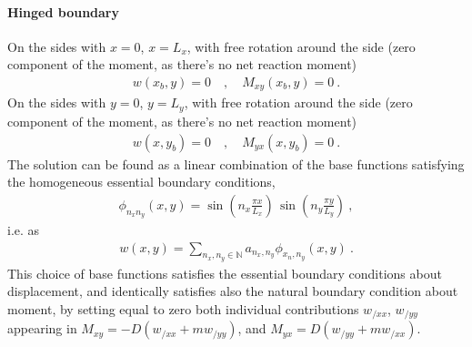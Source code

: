 \documentclass[letterpaper,10pt,english]{jupyterBook}
\begin{document}
\paragraph{Hinged boundary}
\label{\detokenize{ch/solids/plates-shells/kirchhoff:hinged-boundary}}
\sphinxAtStartPar
{} On the sides with \(x = 0\), \(x = L_x\), with free rotation around the side (zero component of the moment, as there’s no net reaction moment)
\begin{equation*}
\begin{split}w(x_b, y  ) = 0 \quad , \quad M_{xy}(x_b,y  ) = 0 \ .\end{split}
\end{equation*}
\sphinxAtStartPar
On the sides with \(y = 0\), \(y = L_y\), with free rotation around the side (zero component of the moment, as there’s no net reaction moment)
\begin{equation*}
\begin{split}w(x  , y_b) = 0 \quad , \quad M_{yx}(x  ,y_b) = 0 \ .\end{split}
\end{equation*}
\sphinxAtStartPar
{} The solution can be found as a linear combination of the base functions satisfying the homogeneous essential boundary conditions,
\begin{equation*}
\begin{split}\phi_{n_x n_y}(x,y) = \sin\left( n_x \frac{\pi x}{L_x} \right) \, \sin\left( n_y \frac{\pi y}{L_y} \right) \ ,\end{split}
\end{equation*}
\sphinxAtStartPar
i.e. as
\begin{equation*}
\begin{split}w(x,y) = \sum_{n_x, n_y \in \mathbb{N}} a_{n_x, n_y} \phi_{x_n, n_y}(x,y) \ .\end{split}
\end{equation*}
\sphinxAtStartPar
{} This choice of base functions satisfies the essential boundary conditions about displacement, and identically satisfies also the natural boundary condition about moment, by setting equal to zero both individual contributions \(w_{/xx}\), \(w_{/yy}\) appearing in \(M_{xy} = - D(w_{/xx} + m w_{/yy})\), and \(M_{yx} =   D(w_{/yy} + m w_{/xx})\).
\end{document}
